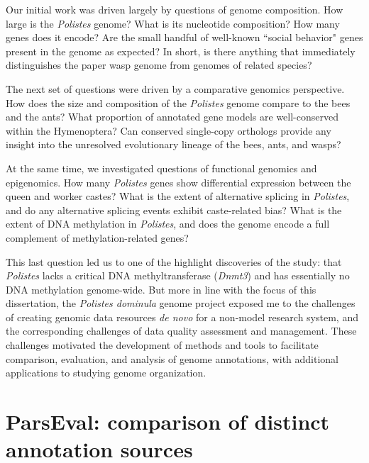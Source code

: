 Our initial work was driven largely by questions of genome composition.
How large is the \textit{Polistes} genome?
What is its nucleotide composition?
How many genes does it encode?
Are the small handful of well-known ``social behavior" genes present in the genome as expected?
In short, is there anything that immediately distinguishes the paper wasp genome from genomes of related species?

The next set of questions were driven by a comparative genomics perspective.
How does the size and composition of the \textit{Polistes} genome compare to the bees and the ants?
What proportion of annotated gene models are well-conserved within the Hymenoptera?
Can conserved single-copy orthologs provide any insight into the unresolved evolutionary lineage of the bees, ants, and wasps?

At the same time, we investigated questions of functional genomics and epigenomics.
How many \textit{Polistes} genes show differential expression between the queen and worker castes?
What is the extent of alternative splicing in \textit{Polistes}, and do any alternative splicing events exhibit caste-related bias?
What is the extent of DNA methylation in \textit{Polistes}, and does the genome encode a full complement of methylation-related genes?

This last question led us to one of the highlight discoveries of the study: that \textit{Polistes} lacks a critical DNA methyltransferase (\textit{Dnmt3}) and has essentially no DNA methylation genome-wide.
But more in line with the focus of this dissertation, the \textit{Polistes dominula} genome project exposed me to the challenges of creating genomic data resources \textit{de novo} for a non-model research system, and the corresponding challenges of data quality assessment and management.
These challenges motivated the development of methods and tools to facilitate comparison, evaluation, and analysis of genome annotations, with additional applications to studying genome organization.

\section{ParsEval: comparison of distinct annotation sources}

